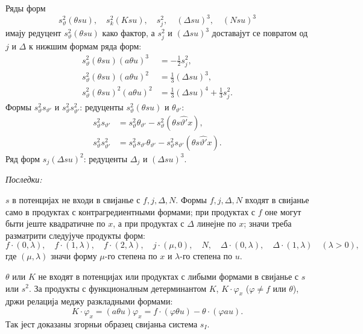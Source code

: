 ﻿\documentclass[11pt]{article}
\begin{document}
Ряды форм
\[
 s_\vartheta^2(\theta su),\quad s_k^2(Ksu),\quad s_j^2,\quad (\Delta su)^3,\quad (Nsu)^3
\]
имају редуцент $s_\vartheta^2(\theta su)$ како фактор, а $s_j^2$ и $(\Delta su)^3$ доставајут се повратом од $j$ и $\Delta$ к нижшим формам ряда форм:
\[
\begin{aligned}
s_\vartheta^2(\theta su)(a\theta u)^3&=-\frac12s_j^2,\\
s_\vartheta^2(\theta su)(a\theta u)^2&=\frac13(\Delta su)^3,\\
s_\vartheta^2(\theta su)^2(a\theta u)^2&=\frac13(\Delta su)^4+\frac13s_j^2.
\end{aligned}
\]
Формы $s_\vartheta^2s_{\vartheta'}$ и $s_\vartheta^2s_{\vartheta'}^2$: редуценты $s_\vartheta^2(\theta su)$ и $\theta_{\vartheta'}$:
\[
\begin{aligned}
s_\vartheta^2s_{\vartheta'}&=s_\vartheta^2\theta_{\vartheta'}-s_\vartheta^2(\theta s\widehat{\vartheta'}x),\\
s_\vartheta^2s_{\vartheta'}^2&=s_\vartheta^2s_{\vartheta'}\theta_{\vartheta'}-s_\vartheta^2s_{\vartheta'}(\theta s\widehat{\vartheta'}x).
\end{aligned}
\]
Ряд форм $s_j(\Delta su)^2$: редуценты $\Delta_j$ и $(\Delta su)^3$.

\noindent\textit{Последки:}

$s$ в потенцијах не входи в свијанье с $f,j,\Delta,N$. Формы $f,j,\Delta,N$ входят в свијанье само в продуктах с контрагредиентными формами; при продуктах с $f$ оне могут быти јеште квадратичне по $x$, а при продуктах с $\Delta$ линејне по $x$; значи треба разматрити следујуче продукты форм:
\[
 f\cdot(0,\lambda),\quad f\cdot(1,\lambda),\quad f\cdot(2,\lambda),\quad
 j\cdot(\mu,0),\quad N,\quad
 \Delta\cdot(0,\lambda),\quad \Delta\cdot(1,\lambda)\quad(\lambda>0),
\]
где $(\mu,\lambda)$ значи форму $\mu$-го степена по $x$ и $\lambda$-го степена по $u$.

$\theta$ или $K$ не входят в потенцијах или продуктах с либыми формами в свијанье с $s$ или $s^2$. За продукты с функционалным детерминантом $K$, $K\cdot\varphi_x$ ($\varphi\ne f$ или $\theta$), држи релација меджу разкладными формами:
\[
K\cdot\varphi_x=(a\theta u)\varphi_x=f\cdot(\varphi\theta u)-\theta\cdot(\varphi a u).
\]
Так јест доказаны згорньи образец свијаньа система $s_I$.
\end{document}
